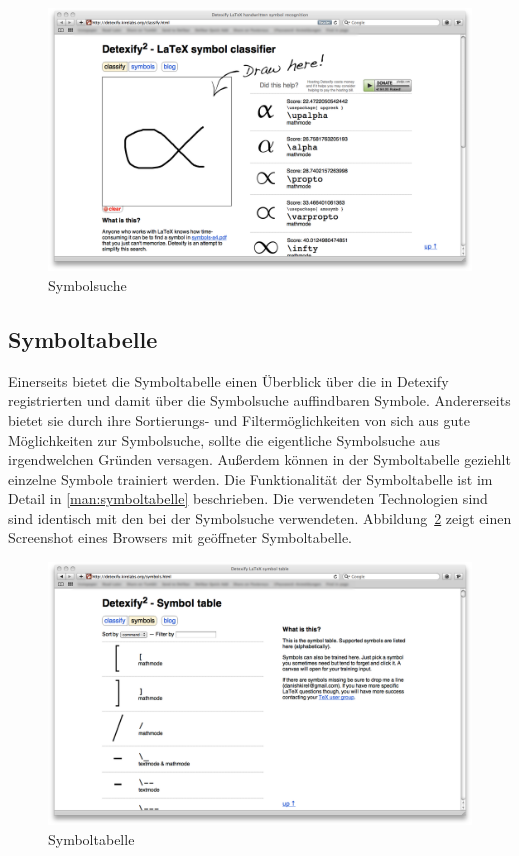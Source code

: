 \begin{figure}
  \centering \includegraphics[width=\textwidth]{figures/interface-classify.png}
  \caption{Symbolsuche}
  \label{fig:symbolsuche}
\end{figure}


\subsection{Symboltabelle} %
\label{sub:symboltabelle}

Einerseits bietet die Symboltabelle einen Überblick über die in Detexify registrierten und damit über die Symbolsuche auffindbaren Symbole. Andererseits bietet sie durch ihre Sortierungs- und Filtermöglichkeiten von sich aus gute Möglichkeiten zur Symbolsuche, sollte die eigentliche Symbolsuche aus irgendwelchen Gründen versagen. Außerdem können in der Symboltabelle geziehlt einzelne Symbole trainiert werden. Die Funktionalität der Symboltabelle ist im Detail in \ref{man:symboltabelle} beschrieben. Die verwendeten Technologien sind sind identisch mit den bei der Symbolsuche verwendeten.
 Abbildung~\ref{fig:symboltabelle} zeigt einen Screenshot eines Browsers mit geöffneter Symboltabelle.

\begin{figure}
  \centering \includegraphics[width=\textwidth]{figures/interface-symbol-table.png}
  \caption{Symboltabelle}
  \label{fig:symboltabelle}
\end{figure}


